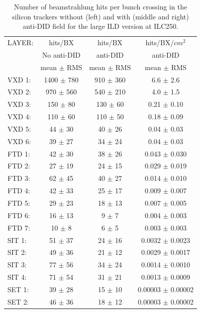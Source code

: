 \begin{table}\hspace*{-0cm}\small
\begin{tabular}{ l c c c }
\toprule
LAYER: & hits/BX & hits/BX & hits/BX/$cm^2$ \\
& No anti-DID & anti-DID & anti-DID \\
& mean $\pm$ RMS & mean $\pm$ RMS & mean $\pm$ RMS \\
\midrule
VXD 1: & 1400 $\pm$ 780 & 910 $\pm$ 360 & 6.6 $\pm$ 2.6 \\
VXD 2: & 970 $\pm$ 560  & 540 $\pm$ 210 & 4.0 $\pm$ 1.5 \\
VXD 3: & 150 $\pm$ 80   & 130 $\pm$ 60  & 0.21 $\pm$ 0.10 \\
VXD 4: & 110 $\pm$ 60   & 110 $\pm$ 50  & 0.18 $\pm$ 0.09 \\
VXD 5: & 44 $\pm$ 30    & 40 $\pm$ 26   & 0.04 $\pm$ 0.03 \\
VXD 6: & 39 $\pm$ 27    & 34 $\pm$ 24   & 0.04 $\pm$ 0.03 \\
\midrule
FTD 1: & 42 $\pm$ 30 & 38 $\pm$ 26 & 0.043 $\pm$ 0.030 \\
FTD 2: & 27 $\pm$ 19 & 24 $\pm$ 15 & 0.029 $\pm$ 0.019 \\
FTD 3: & 62 $\pm$ 45 & 40 $\pm$ 27 & 0.014 $\pm$ 0.010 \\
FTD 4: & 42 $\pm$ 33 & 25 $\pm$ 17 & 0.009 $\pm$ 0.007 \\
FTD 5: & 29 $\pm$ 23 & 18 $\pm$ 13 & 0.007 $\pm$ 0.005 \\
FTD 6: & 16 $\pm$ 13 & 9 $\pm$ 7   & 0.004 $\pm$ 0.003 \\
FTD 7: & 10 $\pm$ 8  & 6 $\pm$ 5   & 0.003 $\pm$ 0.003 \\
\midrule
SIT 1: & 51 $\pm$ 37 & 24 $\pm$ 16 & 0.0032 $\pm$ 0.0023 \\
SIT 2: & 49 $\pm$ 36 & 21 $\pm$ 12 & 0.0029 $\pm$ 0.0017 \\
SIT 3: & 77 $\pm$ 56 & 34 $\pm$ 24 & 0.0014 $\pm$ 0.0010 \\
SIT 4: & 71 $\pm$ 54 & 31 $\pm$ 21 & 0.0013 $\pm$ 0.0009 \\
\midrule
SET 1: & 39 $\pm$ 28 & 15 $\pm$ 10 & 0.00003 $\pm$ 0.00002 \\
SET 2: & 46 $\pm$ 36 & 18 $\pm$ 12 & 0.00003 $\pm$ 0.00002 \\
\bottomrule
\end{tabular}
\caption{\label{ild:tab:BGhits}Number of beamstrahlung hits per bunch crossing in the silicon trackers without (left) and with (middle and right) anti-DID field for the large ILD version at ILC250.}
\end{table}



